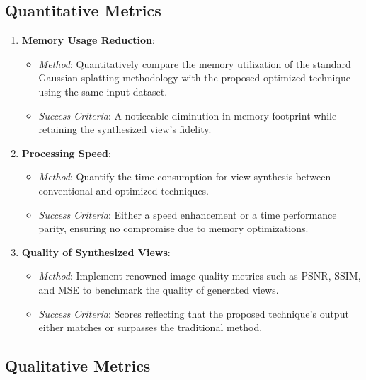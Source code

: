 \documentclass[logo,bsc,singlespacing,parskip]{infthesis}
\begin{document}
\subsection{Quantitative Metrics}

\begin{enumerate}
    \item \textbf{Memory Usage Reduction}:
    \begin{itemize}
        \item \textit{Method}: Quantitatively compare the memory utilization of the standard Gaussian splatting methodology with the proposed optimized technique using the same input dataset.
        \item \textit{Success Criteria}: A noticeable diminution in memory footprint while retaining the synthesized view's fidelity.
    \end{itemize}

    \item \textbf{Processing Speed}:
    \begin{itemize}
        \item \textit{Method}: Quantify the time consumption for view synthesis between conventional and optimized techniques.
        \item \textit{Success Criteria}: Either a speed enhancement or a time performance parity, ensuring no compromise due to memory optimizations.
    \end{itemize}

    \item \textbf{Quality of Synthesized Views}:
    \begin{itemize}
        \item \textit{Method}: Implement renowned image quality metrics such as PSNR, SSIM, and MSE to benchmark the quality of generated views.
        \item \textit{Success Criteria}: Scores reflecting that the proposed technique's output either matches or surpasses the traditional method.
    \end{itemize}
\end{enumerate}

\subsection{Qualitative Metrics}
\end{document}
